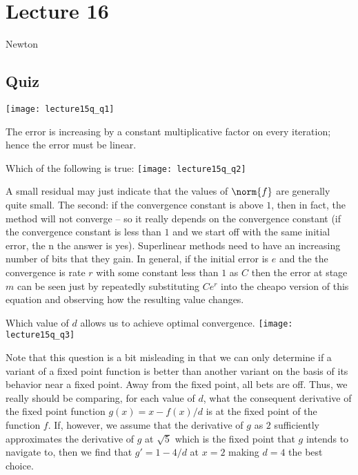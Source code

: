 \documentclass[../main.tex]{subfiles}
\begin{document}
\section{Lecture 16}{Newton}

    \subsection{Quiz}

    \texttt{[image: lecture15q\_q1]}
    \begin{solution}
        The error is increasing by a constant multiplicative factor on every iteration; hence the error must be linear.
    \end{solution}

    Which of the following is true:
    \texttt{[image: lecture15q\_q2]}
    \begin{solution}
        A small residual may just indicate that the values of $\norm{f}$ are generally quite small. The second: if the convergence constant is above $1$, then in fact, the method will not converge -- so it really depends on the convergence constant (if the convergence constant is less than $1$ and we start off with the same initial error, the n the answer is yes). Superlinear methods need to have an increasing number of bits that they gain. In general, if the initial error is $e$ and the the convergence is rate $r$ with some constant less than $1$ as $C$ then the error at stage $m$ can be seen just by repeatedly substituting $Ce^r$ into the cheapo version of this equation and observing how the resulting value changes.
    \end{solution}

    Which value of $d$ allows us to achieve optimal convergence.
    \texttt{[image: lecture15q\_q3]}
    \begin{solution}
        Note that this question is a bit misleading in that we can only determine if a variant of a fixed point function is better than another variant on the basis of its behavior near a fixed point. Away from the fixed point, all bets are off. Thus, we really should be comparing, for each value of $d$, what the consequent derivative of the fixed point function $g(x) = x - f(x)/d$ is at the fixed point of the function $f$. If, however, we assume that the derivative of $g$ as $2$ sufficiently approximates the derivative of $g$ at $\sqrt{5}$ which is the fixed point that $g$ intends to navigate to, then we find that $g' = 1 - 4/d$ at $x = 2$ making $d = 4$ the best choice.
    \end{solution}
\end{document}
